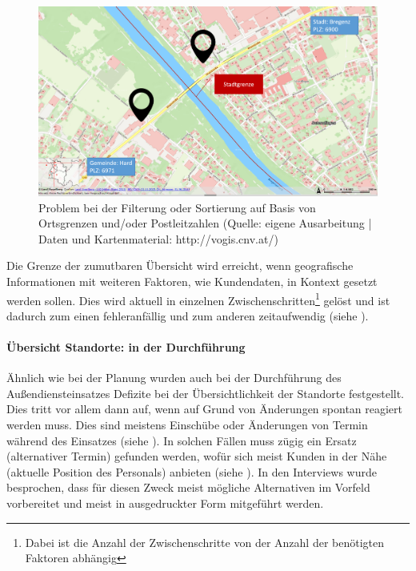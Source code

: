 \documentclass[Bachelorarbeit.tex]{subfiles}
\begin{document}
\begin{figure}[h]
\centering
\includegraphics[width=1\linewidth]{img/Interviews/HarteGrenzen}
\caption[Probleme mit harten Grenzen]{Problem bei der Filterung oder Sortierung auf Basis von Ortsgrenzen und/oder Postleitzahlen (Quelle: eigene Ausarbeitung | Daten und Kartenmaterial: http://vogis.cnv.at/)}
\label{fig:HarteGrenzen}
\end{figure}

Die Grenze der zumutbaren Übersicht wird erreicht, wenn geografische Informationen mit weiteren Faktoren, wie Kundendaten, in Kontext gesetzt werden sollen. 
Dies wird aktuell in einzelnen Zwischenschritten\footnote{Dabei ist die Anzahl der Zwischenschritte von der Anzahl der benötigten Faktoren abhängig} gelöst und ist dadurch zum einen fehleranfällig und zum anderen zeitaufwendig (siehe ).

\paragraph{Übersicht Standorte: in der Durchführung}
Ähnlich wie bei der Planung wurden auch bei der Durchführung des Außendiensteinsatzes Defizite bei der Übersichtlichkeit der Standorte festgestellt. 
Dies tritt vor allem dann auf, wenn auf Grund von Änderungen spontan reagiert werden muss.
Dies sind meistens Einschübe oder Änderungen von Termin während des Einsatzes (siehe ). 
In solchen Fällen muss zügig ein Ersatz (alternativer Termin) gefunden werden, wofür sich meist Kunden in der Nähe (aktuelle Position des Personals) anbieten (siehe ).
In den Interviews wurde besprochen, dass für diesen Zweck meist mögliche Alternativen im Vorfeld vorbereitet und meist in ausgedruckter Form mitgeführt werden. 
\newpage
\end{document}
